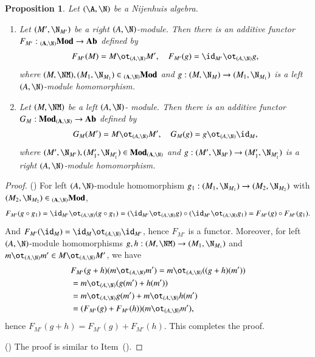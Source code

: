 \documentclass[12pt]{amsart}
\newtheorem{prop}[theorem]{Proposition}
\theoremstyle{definition}
\begin{document}
\begin{prop}
Let $(\A,\N)$ be a Nijenhuis algebra.
\begin{enumerate}
\item Let $(M',\N_{M'})$ be a right $(A,\N)$-module. Then 
there is an additive functor $F_{M'}:  {\bf _{(A,\N)} Mod} \to {\bf Ab}$ defined by
\begin{align*}
F_{M'}(M) = M \ot_{(A,\N)} M' , \quad F_{M'}(g) = \id_{M'} \ot_{(A,\N)} g,
\end{align*}
where $(M, \NM), (M_1, \N_{M_1}) \in  {\bf _{(A,\N)} Mod}$ and $g:(M,\N_{M}) \to (M_1,\N_{M_1})$ is a left $(A,\N)$-module homomorphism.

\item Let $(M,\NM)$ be a left $(A,\N)$- module. Then
there is an additive functor $G_{M}: {\bf Mod_{(A,\N)}} \to {\bf Ab}$ defined by
\begin{align*}
G_{M}(M') = M \ot_{(A,\N)} M', \quad G_M(g) = g \ot_{(A,\N)} \id_M,
\end{align*}
where $(M',\N_{M'}), (M'_1, \N_{M'_1}) \in {\bf Mod_{(A,\N)}}$ and $g:(M',\N_{M'}) \to (M'_1,\N_{M'_1})$ is a right $(A, \N)$-module homomorphism.
\end{enumerate}
\end{prop}

\begin{proof}
() For left $(A,\N)$-module homomorphism $g_1:(M_1,\N_{M_1}) \to (M_2,\N_{M_2})$ with $(M_2, \N_{M_2}) \in {\bf _{(A,\N)} Mod}$,
\begin{align*}
F_{M'}(g\circ g_1) = \id_{M'} \ot_{(A,\N)} (g\circ g_1) = (\id_{M'} \ot_{(A,\N)} g)\circ(\id_{M'} \ot_{(A,\N)} g_1) = F_{M'}(g)\circ F_{M'}(g_1). 
\end{align*}
And $F_{M'}(\id_M) = \id_{M} \ot_{(A,\N)} \id_{M'}$, hence $F_{M'}$ is a functor. Moreover, for left $(A,\N)$-module homomorphisms $g,h: (M,\NM) \to (M_1, \N_{M_1})$ and $m \ot_{(A,\N)} m' \in M \ot_{(A,\N)} M'$, we have
\begin{align*}
& F_{M'}(g+h)(m \ot_{(A,\N)} m') = m \ot_{(A,\N)} ((g+h)(m')) \\
%
&= m \ot_{(A,\N)} (g(m') + h(m')) \\
%
&= m\ot_{(A,\N)} g(m') + m \ot_{(A,\N)} h(m') \\
%
&= ( F_{M'}(g) + F_{M'}(h)) (m\ot_{(A,\N)} m'),
\end{align*}
hence $F_{M'}(g+h)=F_{M'}(g)+F_{M'}(h)$. This completes the proof.

() The proof is similar to Item~().
\end{proof}
\end{document}
